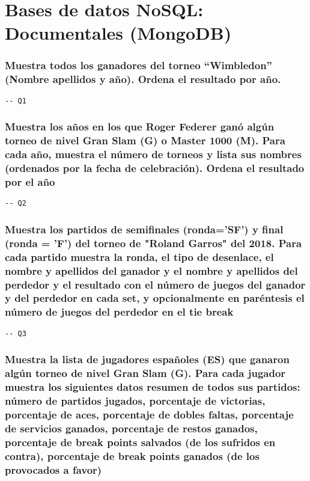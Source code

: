 \section{Bases de datos NoSQL: Documentales (MongoDB)}

\subsubsection{Muestra todos los ganadores del torneo ``Wimbledon'' (Nombre apellidos y año). Ordena el resultado por año.}

\begin{verbatim}
-- Q1
\end{verbatim}





\subsubsection{Muestra los años en los que Roger Federer ganó algún torneo de nivel Gran Slam (G) o Master 1000 (M). Para cada año, muestra el número de torneos y lista sus nombres (ordenados por la fecha de celebración). Ordena el resultado por el año}

\begin{verbatim}
-- Q2
\end{verbatim}





\subsubsection{Muestra los partidos de semiﬁnales (ronda='SF') y ﬁnal (ronda = 'F') del torneo de "Roland Garros" del 2018. Para cada partido muestra la ronda, el tipo de desenlace, el nombre y apellidos del ganador y el nombre y apellidos del perdedor y el resultado con el número de juegos del ganador y del perdedor en cada set, y opcionalmente en paréntesis el número de juegos del perdedor en el tie break}

\begin{verbatim}
-- Q3
\end{verbatim}





\subsubsection{Muestra la lista de jugadores españoles (ES) que ganaron algún torneo de nivel Gran Slam (G). Para cada jugador muestra los siguientes datos resumen de todos sus partidos: número de partidos jugados, porcentaje de victorias, porcentaje de aces, porcentaje de dobles faltas, porcentaje de servicios ganados, porcentaje de restos ganados, porcentaje de break points salvados (de los sufridos en contra), porcentaje de break points ganados (de los provocados a favor)}

